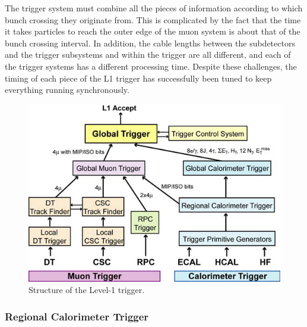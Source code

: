 The trigger system must combine all the pieces of information 
according to which bunch crossing they originate from.   
This is complicated by the fact that the time it takes particles 
to reach the outer edge of the muon system 
is about that of the bunch crossing interval.  
In addition, the cable lengths between the subdetectors 
and the trigger subsystems and within the trigger are 
all different, 
and each of the trigger systems has a different processing time.  
Despite these challenges, the timing of each piece of 
the L1 trigger has successfully been tuned to keep everything running 
synchronously.  



 \begin{figure}[htb]
  \begin{center}
    \includegraphics[width=360pt]{Figures/L1structure.png}
  \end{center}
  \caption[Structure of the Level-1 trigger]{Structure of the Level-1 trigger.}
  \label{fig:L1Structure}
 \end{figure}

\subsubsection{Regional Calorimeter Trigger}

